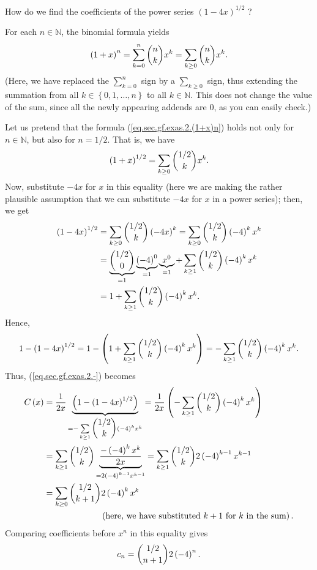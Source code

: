 How do we find the coefficients of the power series $\left(  1-4x\right)
^{1/2}$ ?

For each $n\in\mathbb{N}$, the binomial formula yields%
\begin{equation}
\left(  1+x\right)  ^{n}=\sum_{k=0}^{n}\dbinom{n}{k}x^{k}=\sum_{k\geq0}%
\dbinom{n}{k}x^{k}. \label{eq.sec.gf.exas.2.(1+x)n}%
\end{equation}
(Here, we have replaced the $\sum_{k=0}^{n}$ sign by a $\sum_{k\geq0}$ sign,
thus extending the summation from all $k\in\left\{  0,1,\ldots,n\right\}  $ to
all $k\in\mathbb{N}$. This does not change the value of the sum, since all the
newly appearing addends are $0$, as you can easily check.)

Let us pretend that the formula (\ref{eq.sec.gf.exas.2.(1+x)n}) holds not only
for $n\in\mathbb{N}$, but also for $n=1/2$. That is, we have%
\begin{equation}
\left(  1+x\right)  ^{1/2}=\sum_{k\geq0}\dbinom{1/2}{k}x^{k}.
\label{eq.sec.gf.exas.2.(1+x)1/2}%
\end{equation}
Now, substitute $-4x$ for $x$ in this equality (here we are making the rather
plausible assumption that we can substitute $-4x$ for $x$ in a power series);
then, we get%
\begin{align*}
\left(  1-4x\right)  ^{1/2}  &  =\sum_{k\geq0}\dbinom{1/2}{k}\left(
-4x\right)  ^{k}=\sum_{k\geq0}\dbinom{1/2}{k}\left(  -4\right)  ^{k}x^{k}\\
&  =\underbrace{\dbinom{1/2}{0}}_{=1}\underbrace{\left(  -4\right)  ^{0}}%
_{=1}\underbrace{x^{0}}_{=1}+\sum\limits_{k\geq1}\dbinom{1/2}{k}\left(
-4\right)  ^{k}x^{k}\\
&  =1+\sum\limits_{k\geq1}\dbinom{1/2}{k}\left(  -4\right)  ^{k}x^{k}.
\end{align*}
Hence,%
\[
1-\left(  1-4x\right)  ^{1/2}=1-\left(  1+\sum\limits_{k\geq1}\dbinom{1/2}%
{k}\left(  -4\right)  ^{k}x^{k}\right)  =-\sum\limits_{k\geq1}\dbinom{1/2}%
{k}\left(  -4\right)  ^{k}x^{k}.
\]
Thus, (\ref{eq.sec.gf.exas.2.-}) becomes%
\begin{align*}
C\left(  x\right)   &  =\dfrac{1}{2x}\underbrace{\left(  1-\left(
1-4x\right)  ^{1/2}\right)  }_{=-\sum\limits_{k\geq1}\dbinom{1/2}{k}\left(
-4\right)  ^{k}x^{k}}=\dfrac{1}{2x}\left(  -\sum\limits_{k\geq1}\dbinom
{1/2}{k}\left(  -4\right)  ^{k}x^{k}\right) \\
&  =\sum\limits_{k\geq1}\dbinom{1/2}{k}\underbrace{\dfrac{-\left(  -4\right)
^{k}x^{k}}{2x}}_{=2\left(  -4\right)  ^{k-1}x^{k-1}}=\sum\limits_{k\geq
1}\dbinom{1/2}{k}2\left(  -4\right)  ^{k-1}x^{k-1}\\
&  =\sum\limits_{k\geq0}\dbinom{1/2}{k+1}2\left(  -4\right)  ^{k}x^{k}\\
&  \ \ \ \ \ \ \ \ \ \ \ \ \ \ \ \ \ \ \ \ \left(  \text{here, we have
substituted }k+1\text{ for }k\text{ in the sum}\right)  .
\end{align*}
Comparing coefficients before $x^{n}$ in this equality gives%
\begin{equation}
c_{n}=\dbinom{1/2}{n+1}2\left(  -4\right)  ^{n}.
\label{eq.sec.gf.exas.cn=frac}%
\end{equation}


